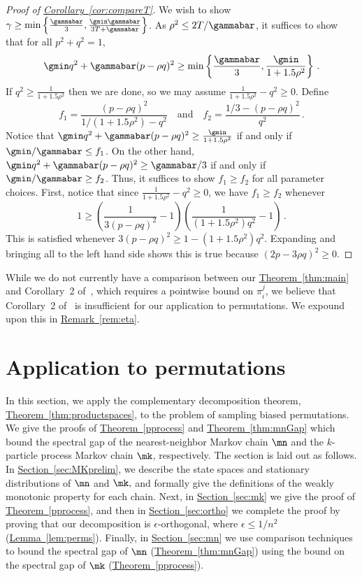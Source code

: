\documentclass[11pt]{article}
\providecommand{\expref}[2]{\texorpdfstring{\hyperref[#2]{#1~\ref{#2}}}{#1~\ref{#2}}}
\begin{document}
%
%
%
\begin{proof}[Proof of \expref{Corollary}{cor:compareT}]
We wish to show $\gamma\geq \min\left\{\frac{\gammabar}{3}, 
\frac{\gmin\gammabar}{3T+\gammabar}\right\}$. As $\rho^2\leq 
2T/\gammabar$, it suffices to show that for all $p^2+q^2=1$,
 \[\gmin q^2+\gammabar(p-\rho q)^2\geq \min\left\{\frac{\gammabar}{3}, \frac{\gmin}{1+1.5\rho^2}\right\}\,.\]
 If $q^2\geq \frac{1}{1+1.5\rho^2}$ then we are done, so we may assume
 $\frac{1}{1+1.5\rho^2}-q^2\geq 0$.
 Define
  \[f_1=\frac{(p-\rho q)^2}{1/(1+1.5\rho^2) - q^2} \quad \text{and}
  \quad f_2=\frac{1/3 - (p-\rho q)^2}{q^2}\,.\]
 Notice that $\gmin q^2+\gammabar(p-\rho q)^2\geq
 \frac{\gmin}{1+1.5\rho^2}$ if and only if $\gmin/\gammabar\leq f_1$.
 On the other hand, $\gmin q^2+\gammabar(p-\rho q)^2\geq \gammabar/3$ if
 and only if $\gmin/\gammabar\geq f_2$.  Thus, it suffices to show
 $f_1\geq f_2$ for all parameter choices.
First, notice that since $\frac{1}{1+1.5\rho^2}-q^2\geq 0$, we have  $f_1\geq f_2$ whenever
 \[1\geq \left(\frac{1}{3(p-\rho
   q)^2}-1\right)\left(\frac{1}{(1+1.5\rho^2)q^2}-1\right)\,.\]
This is satisfied whenever $3(p-\rho q)^2\geq 1-(1+1.5\rho^2)q^2$.
Expanding and bringing all to the left hand side shows this is true because $(2p-3\rho q)^2\geq 0$.
\end{proof}
%

While we do not currently have a comparison between our
\expref{Theorem}{thm:main} and Corollary~2 of~\cite{jstv04}, which requires
a pointwise bound on $\pi_i^j$, we believe that Corollary~2 of~\cite{jstv04}
is insufficient for our application to permutations.  We expound
upon this in \expref{Remark}{rem:eta}.



\section{Application to permutations}\label{sec:perm}
In this section, we apply the complementary decomposition theorem, 
\expref{Theorem}{thm:productspaces}, to the problem of sampling biased permutations.  
We give the proofs of \expref{Theorem}{pprocess} and \expref{Theorem}{thm:mnGap} which bound the spectral gap of the nearest-neighbor Markov chain $\mn$ and the $k$-particle process Markov chain $\mk$, respectively.  
The section is laid out as follows.  In \expref{Section}{sec:MKprelim}, 
we describe the state spaces and stationary distributions of $\mn$ and $\mk,$ and formally give the definitions of the weakly monotonic 
property for each chain.  Next, in \expref{Section}{sec:mk} we give the proof of 
\expref{Theorem}{pprocess}, and then in \expref{Section}{sec:ortho} we complete the 
proof by proving that our decomposition is 
%
$\epsilon$-orthogonal, where $\epsilon\leq 1/n^2$ %
(\expref{Lemma}{lem:perms}). Finally, in \expref{Section}{sec:mn} we use comparison techniques~\cite{dsc, RT98} to bound the spectral gap of $\mn$ (\expref{Theorem}{thm:mnGap}) using the bound on the spectral gap of $\mk$ (\expref{Theorem}{pprocess}).   
\end{document}
